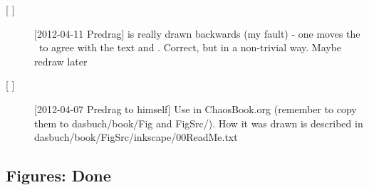 \begin{description}
\item[{[ ]}]  [2012-04-11 Predrag]  is really
        drawn backwards (my fault) - one moves the \template\ to agree
        with the text and  . Correct, but in a
        non-trivial way. Maybe redraw later
													
\item[{[ ]}] [2012-04-07 Predrag to himself]                               \toCB
Use  in ChaosBook.org (remember to copy them to
dasbuch/book/Fig and FigSrc/). How it was drawn is described in
dasbuch/book/FigSrc/inkscape/00ReadMe.txt

\end{description}

\subsection{Figures: Done}
\label{s:figsDone}

